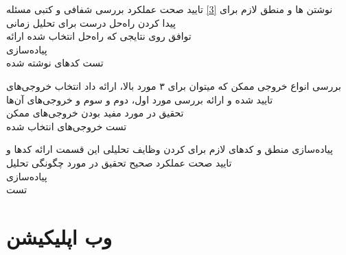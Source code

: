 \begin{wbsbox}{}
\begin{wbssub}
{نوشتن ها و منطق لازم برای \ref{3}}
{تایید صحت عملکرد}
\task 
بررسی شفافی و کتبی مسئله \\
\task
پیدا کردن راه‌حل درست برای تحلیل زمانی \\
\task
توافق روی نتایجی که راه‌حل انتخاب شده ارائه \\
\task
پیاده‌سازی \\
\task
تست کد‌‌های نوشته شده
\end{wbssub}

\begin{wbssub}
{بررسی انواع خروجی ممکن که میتوان برای ۳ مورد بالا، ارائه داد}
{انتخاب خروجی‌های تایید شده و ارائه}
\task
بررسی مورد اول، دوم و سوم و خروجی‌های آن‌ها \\
\task
تحقیق در مورد مفید بودن خروجی‌های ممکن \\
\task
تست خروجی‌های انتخاب شده
\end{wbssub}

\begin{wbssub}
{پیاده‌سازی منطق‌ و کد‌های لازم برای  کردن وظایف تحلیلی این قسمت}
{ارائه کد‌‌ها و تایید صحت عملکرد صحیح}
\task
تحقیق در مورد چگونگی تحلیل \\
\task
پیاده‌سازی \\
\task
تست
\end{wbssub}
\end{wbsbox}

\section{وب اپلیکیشن}